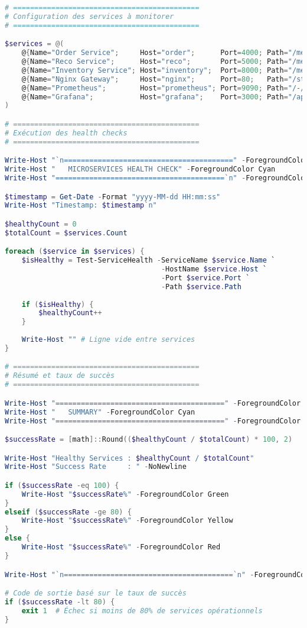 \documentclass[11pt,a4paper]{report}
\begin{document}
\begin{lstlisting}[language=PowerShell, caption=monitor-services.ps1 - Health Checks Automatisés, basicstyle=\ttfamily\tiny]
# ============================================
# Configuration des services à monitorer
# ============================================

$services = @(
    @{Name="Order Service";     Host="order";      Port=4000; Path="/metrics"},
    @{Name="Reco Service";      Host="reco";       Port=5000; Path="/metrics"},
    @{Name="Inventory Service"; Host="inventory";  Port=8000; Path="/metrics"},
    @{Name="Nginx Gateway";     Host="nginx";      Port=80;   Path="/stub_status"},
    @{Name="Prometheus";        Host="prometheus"; Port=9090; Path="/-/healthy"},
    @{Name="Grafana";           Host="grafana";    Port=3000; Path="/api/health"}
)

# ============================================
# Exécution des health checks
# ============================================

Write-Host "`n========================================" -ForegroundColor Cyan
Write-Host "   MICROSERVICES HEALTH CHECK" -ForegroundColor Cyan
Write-Host "========================================`n" -ForegroundColor Cyan

$timestamp = Get-Date -Format "yyyy-MM-dd HH:mm:ss"
Write-Host "Timestamp: $timestamp`n"

$healthyCount = 0
$totalCount = $services.Count

foreach ($service in $services) {
    $isHealthy = Test-ServiceHealth -ServiceName $service.Name `
                                     -HostName $service.Host `
                                     -Port $service.Port `
                                     -Path $service.Path
    
    if ($isHealthy) { 
        $healthyCount++ 
    }
    
    Write-Host "" # Ligne vide entre services
}

# ============================================
# Résumé et taux de succès
# ============================================

Write-Host "========================================" -ForegroundColor Cyan
Write-Host "   SUMMARY" -ForegroundColor Cyan
Write-Host "========================================" -ForegroundColor Cyan

$successRate = [math]::Round(($healthyCount / $totalCount) * 100, 2)

Write-Host "Healthy Services : $healthyCount / $totalCount"
Write-Host "Success Rate     : " -NoNewline

if ($successRate -eq 100) {
    Write-Host "$successRate%" -ForegroundColor Green
}
elseif ($successRate -ge 80) {
    Write-Host "$successRate%" -ForegroundColor Yellow
}
else {
    Write-Host "$successRate%" -ForegroundColor Red
}

Write-Host "`n========================================`n" -ForegroundColor Cyan

# Code de sortie basé sur le taux de succès
if ($successRate -lt 80) {
    exit 1  # Échec si moins de 80% de services opérationnels
}
\end{lstlisting}
\end{document}
